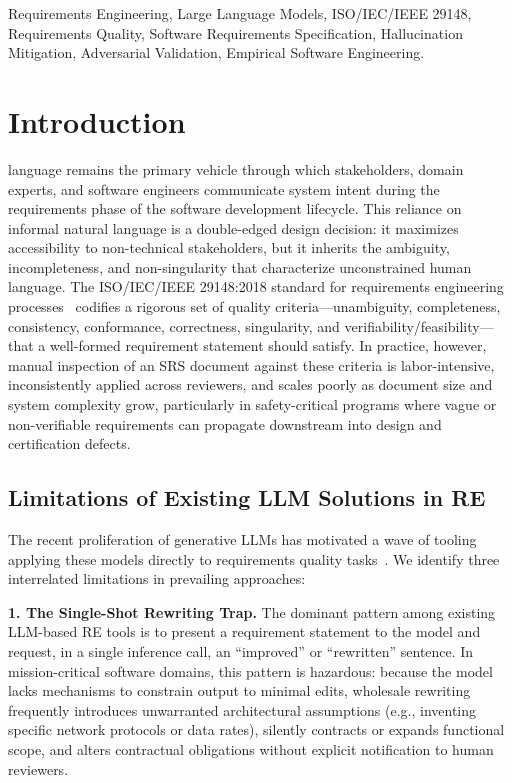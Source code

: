 \documentclass[journal]{IEEEtran}
\begin{document}
\begin{IEEEkeywords}
Requirements Engineering, Large Language Models, ISO/IEC/IEEE 29148, Requirements Quality, Software Requirements Specification, Hallucination Mitigation, Adversarial Validation, Empirical Software Engineering.
\end{IEEEkeywords}

\section{Introduction}
\label{sec:introduction}

 language remains the primary vehicle through which stakeholders, domain experts, and software engineers communicate system intent during the requirements phase of the software development lifecycle. This reliance on informal natural language is a double-edged design decision: it maximizes accessibility to non-technical stakeholders, but it inherits the ambiguity, incompleteness, and non-singularity that characterize unconstrained human language. The ISO/IEC/IEEE 29148:2018 standard for requirements engineering processes~\cite{iso29148} codifies a rigorous set of quality criteria---unambiguity, completeness, consistency, conformance, correctness, singularity, and verifiability/feasibility---that a well-formed requirement statement should satisfy. In practice, however, manual inspection of an SRS document against these criteria is labor-intensive, inconsistently applied across reviewers, and scales poorly as document size and system complexity grow, particularly in safety-critical programs where vague or non-verifiable requirements can propagate downstream into design and certification defects.

\subsection{Limitations of Existing LLM Solutions in RE}
\label{sec:limitations}

The recent proliferation of generative LLMs has motivated a wave of tooling applying these models directly to requirements quality tasks~\cite{ronanki2023requirements}. We identify three interrelated limitations in prevailing approaches:

\textbf{1. The Single-Shot Rewriting Trap.} The dominant pattern among existing LLM-based RE tools is to present a requirement statement to the model and request, in a single inference call, an ``improved'' or ``rewritten'' sentence. In mission-critical software domains, this pattern is hazardous: because the model lacks mechanisms to constrain output to minimal edits, wholesale rewriting frequently introduces unwarranted architectural assumptions (e.g., inventing specific network protocols or data rates), silently contracts or expands functional scope, and alters contractual obligations without explicit notification to human reviewers.
\end{document}
